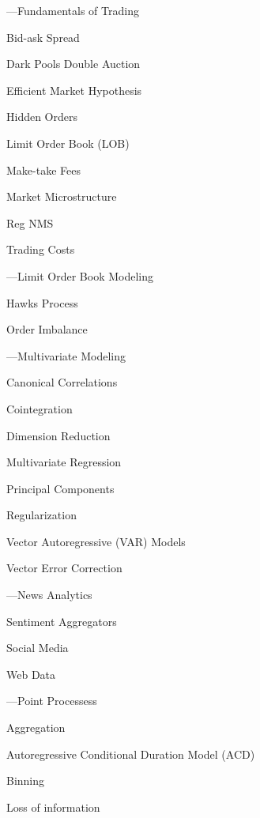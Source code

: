 %
\begin{minipage}{0.40\textwidth}
\noindent ---Fundamentals of Trading 
	\begin{flushright}
	Bid-ask Spread \par
	Dark Pools
	Double Auction \par
	Efficient Market Hypothesis \par
	Hidden Orders \par
	Limit Order Book (LOB) \par
	Make-take Fees \par
	Market Microstructure \par
	Reg NMS \par
	Trading Costs
	\end{flushright}


\noindent ---Limit Order Book Modeling
	\begin{flushright}
	Hawks Process \par
	Order Imbalance
	\end{flushright}


\noindent ---Multivariate Modeling
	\begin{flushright}
	Canonical Correlations \par
	Cointegration \par
	Dimension Reduction \par
	Multivariate Regression \par
	Principal Components \par
	Regularization \par
	Vector Autoregressive (VAR) Models \par
	Vector Error Correction
	\end{flushright}


\noindent ---News Analytics
	\begin{flushright}
	Sentiment Aggregators \par
	Social Media \par
	Web Data 
	\end{flushright}


\noindent ---Point Processess
	\begin{flushright}
	Aggregation \par
	Autoregressive Conditional Duration Model (ACD) \par
	Binning \par
	Loss of information 
	\end{flushright}
\end{minipage} \newpage
%
